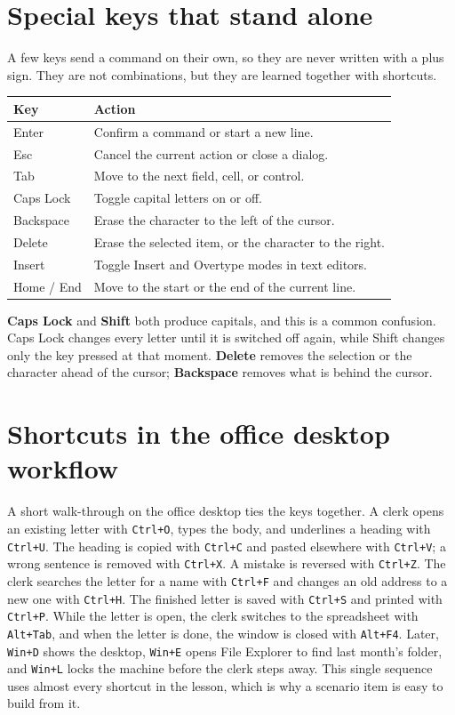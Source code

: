 \documentclass[11pt]{article}
\begin{document}
\section{Special keys that stand alone}
A few keys send a command on their own, so they are never written with a plus
sign. They are not combinations, but they are learned together with shortcuts.

\begin{center}
\begin{tabular}{p{}p{}}
\toprule
\textbf{Key} & \textbf{Action} \\
\midrule
Enter & Confirm a command or start a new line. \\
Esc & Cancel the current action or close a dialog. \\
Tab & Move to the next field, cell, or control. \\
Caps Lock & Toggle capital letters on or off. \\
Backspace & Erase the character to the left of the cursor. \\
Delete & Erase the selected item, or the character to the right. \\
Insert & Toggle Insert and Overtype modes in text editors. \\
Home / End & Move to the start or the end of the current line. \\
\bottomrule
\end{tabular}
\end{center}

\textbf{Caps Lock} and \textbf{Shift} both produce capitals, and this is a
common confusion. Caps Lock changes every letter until it is switched off
again, while Shift changes only the key pressed at that moment. \textbf{Delete}
removes the selection or the character ahead of the cursor; \textbf{Backspace}
removes what is behind the cursor.

\section{Shortcuts in the office desktop workflow}
A short walk-through on the office desktop ties the keys together. A clerk
opens an existing letter with \texttt{Ctrl+O}, types the body, and underlines a
heading with \texttt{Ctrl+U}. The heading is copied with \texttt{Ctrl+C} and
pasted elsewhere with \texttt{Ctrl+V}; a wrong sentence is removed with
\texttt{Ctrl+X}. A mistake is reversed with \texttt{Ctrl+Z}. The clerk searches
the letter for a name with \texttt{Ctrl+F} and changes an old address to a new
one with \texttt{Ctrl+H}. The finished letter is saved with \texttt{Ctrl+S} and
printed with \texttt{Ctrl+P}. While the letter is open, the clerk switches to
the spreadsheet with \texttt{Alt+Tab}, and when the letter is done, the window
is closed with \texttt{Alt+F4}. Later, \texttt{Win+D} shows the desktop,
\texttt{Win+E} opens File Explorer to find last month's folder, and \texttt{Win+L}
locks the machine before the clerk steps away. This single sequence uses almost
every shortcut in the lesson, which is why a scenario item is easy to build
from it.
\end{document}
